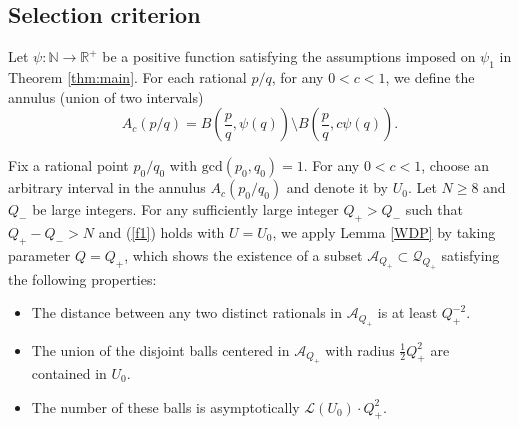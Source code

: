 \documentclass[11pt]{amsart}
\numberwithin{equation}{section}
\newcommand{\0}{\mathbf{0}}
\theoremstyle{remark}
\begin{document}
{
\subsection{Selection criterion}\label{select}
Let $\psi:\mathbb{N}\rightarrow \mathbb{R}^+$ be a positive function satisfying the assumptions imposed on $\psi_1$ in Theorem \ref{thm:main}. 
For each rational $p/q$, for any $0<c<1$, we define the annulus (union of two intervals)
$$A_c(p/q)=B\left(\frac{p}{q},\psi(q)\right)\setminus B\left(\frac{p}{q},c\psi(q)\right).$$ 

Fix a rational point $p_0/q_0$ with $\textrm{gcd}(p_0,q_0)=1$. For any $0<c<1$, choose an arbitrary interval in the annulus $A_{c}(p_0/q_0)$ and denote it by $U_0$. Let $N\ge 8$ and $Q_-$ be large integers. For any sufficiently large integer $Q_+>Q_-$ such that $Q_+-Q_->N$ and (\ref{f1}) holds with $U=U_0$, we apply Lemma \ref{WDP} by taking parameter $Q=Q_+$, which shows the existence of a subset $\mathcal{A}_{Q_+}\subset \mathcal{Q}_{Q_+}$ satisfying the following properties:
\begin{itemize}
  \item The distance between any two distinct rationals in $\mathcal{A}_{Q_+}$ is at least $Q_+^{-2}$.

     \item The union of the disjoint balls centered in $\mathcal{A}_{Q_+}$ with radius $\frac12Q_+^2$ are contained in $U_0$.
    \item The number of these balls is asymptotically $\mathcal{L}(U_0)\cdot Q_+^{2}$.
\end{itemize}





}
\end{document}
